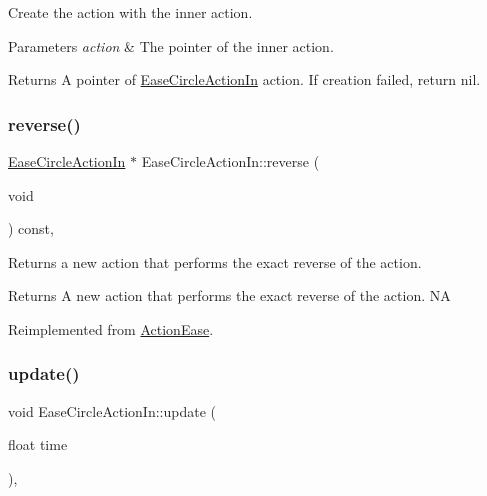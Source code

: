 Create the action with the inner action. 


\begin{DoxyParams}{Parameters}
{\em action} & The pointer of the inner action. \\
\hline
\end{DoxyParams}
\begin{DoxyReturn}{Returns}
A pointer of \hyperlink{classEaseCircleActionIn}{Ease\+Circle\+Action\+In} action. If creation failed, return nil. 
\end{DoxyReturn}
\mbox{\label{classEaseCircleActionIn_ac395a5073afd9b357e7bd02f37d65ff3}} 
\subsubsection{\texorpdfstring{reverse()}{reverse()}}
{\footnotesize\ttfamily \hyperlink{classEaseCircleActionIn}{Ease\+Circle\+Action\+In} $\ast$ Ease\+Circle\+Action\+In\+::reverse (\begin{DoxyParamCaption}\item[{void}]{ }\end{DoxyParamCaption}) const\hspace{0.3cm}{\ttfamily [override]}, {\ttfamily [virtual]}}

Returns a new action that performs the exact reverse of the action.

\begin{DoxyReturn}{Returns}
A new action that performs the exact reverse of the action.  NA 
\end{DoxyReturn}


Reimplemented from \hyperlink{classActionEase_ab99eb083fa033fae1d6c948fdc730782}{Action\+Ease}.

\mbox{\label{classEaseCircleActionIn_a8d48762a47eb738ca2b8fb644182e91b}} 
\subsubsection{\texorpdfstring{update()}{update()}}
{\footnotesize\ttfamily void Ease\+Circle\+Action\+In\+::update (\begin{DoxyParamCaption}\item[{float}]{time }\end{DoxyParamCaption})\hspace{0.3cm}{\ttfamily [override]}, {\ttfamily [virtual]}}

